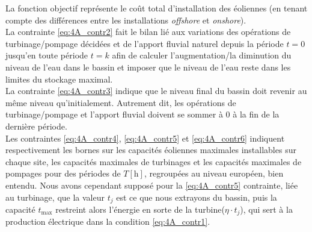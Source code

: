 \documentclass{article}
\newcommand{\unit}[1]{[\mathrm{#1}]}
\begin{document}
\newpage

La fonction objectif représente le coût total d'installation des éoliennes (en tenant compte des différences entre les installations \textit{offshore} et \textit{onshore}). \\
La contrainte \eqref{eq:4A_contr2} fait le bilan lié aux variations des opérations de turbinage/pompage décidées et de l'apport fluvial naturel depuis la période $t = 0$ jusqu'en toute période $t = k$ afin de calculer l'augmentation/la diminution du niveau de l'eau dans le bassin 
et imposer que le niveau de l'eau reste dans les limites du stockage maximal.\\
La contrainte \eqref{eq:4A_contr3} indique que le niveau final du bassin doit revenir au même niveau qu'initialement. Autrement dit, les opérations de turbinage/pompage et 
l'apport fluvial doivent se sommer à 0 à la fin de la dernière période.\\
Les contraintes \eqref{eq:4A_contr4}, \eqref{eq:4A_contr5} et \eqref{eq:4A_contr6} indiquent respectivement les bornes sur les capacités éoliennes maximales installables sur chaque site, 
les capacités maximales de turbinages et les capacités maximales de pompages pour des périodes de $T \unit{h}$, regroupées au niveau européen, bien entendu.
Nous avons cependant supposé pour la \eqref{eq:4A_contr5} contrainte, liée au turbinage, que la valeur $t_j$ est ce que 
nous extrayons du bassin, puis
la capacité $t_\mathrm{max}$ restreint alors l'énergie en sorte de la turbine($\eta \cdot t_j$), qui sert à la 
production électrique dans la condition \eqref{eq:4A_contr1}.

\newpage %
\end{document}
